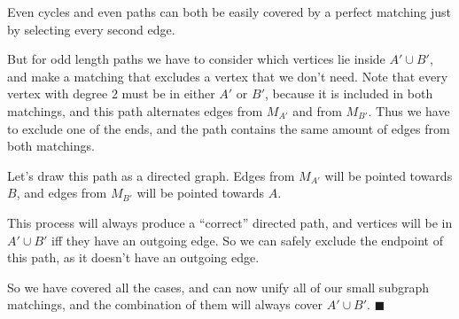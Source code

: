 \documentclass{article}
\let\emptyset\varnothing
\begin{document}
  Even cycles and even paths can both be easily covered by a perfect matching just by selecting every second edge.
  \begin{center}
  \end{center}
  But for odd length paths we have to consider which vertices lie inside $A' \cup B'$,
  and make a matching that excludes a vertex that we don't need.
  Note that every vertex with degree 2 must be in either $A'$ or $B'$, because it is included in both matchings,
  and this path alternates edges from $M_{A'}$ and from $M_{B'}$.
  Thus we have to exclude one of the ends, and the path contains the same amount of edges from both matchings.

  Let's draw this path as a directed graph.
  Edges from $M_{A'}$ will be pointed towards $B$, and edges from $M_{B'}$ will be pointed towards $A$.
  \begin{center}
  \end{center}
  This process will always produce a ``correct'' directed path, and vertices will be in $A' \cup B'$ iff they have an outgoing edge.
  So we can safely exclude the endpoint of this path, as it doesn't have an outgoing edge.

  So we have covered all the cases, and can now unify all of our small subgraph matchings,
  and the combination of them will always cover $A' \cup B'$.
  $\blacksquare$
\end{document}
